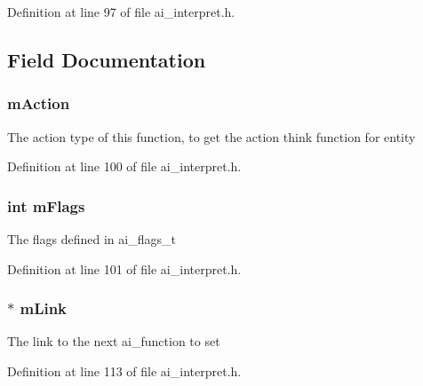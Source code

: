 Definition at line 97 of file ai\+\_\+interpret.\+h.



\subsection{Field Documentation}
\subsubsection[{\texorpdfstring{m\+Action}{mAction}}]{ m\+Action}\hypertarget{structai__function__s_a99f128ebf8f9bb2be7e2ffaee33c5554}{}\label{structai__function__s_a99f128ebf8f9bb2be7e2ffaee33c5554}
The action type of this function, to get the action think function for entity 

Definition at line 100 of file ai\+\_\+interpret.\+h.

\subsubsection[{\texorpdfstring{m\+Flags}{mFlags}}]{\setlength{\rightskip}{0pt plus 5cm}int m\+Flags}\hypertarget{structai__function__s_ab64996ddf8cd7006232fcb79bc296b03}{}\label{structai__function__s_ab64996ddf8cd7006232fcb79bc296b03}
The flags defined in ai\+\_\+flags\+\_\+t 

Definition at line 101 of file ai\+\_\+interpret.\+h.

\subsubsection[{\texorpdfstring{m\+Link}{mLink}}]{$\ast$ m\+Link}\hypertarget{structai__function__s_a7965c244eab12a7cdc29c447b8c76dbc}{}\label{structai__function__s_a7965c244eab12a7cdc29c447b8c76dbc}
The link to the next ai\+\_\+function to set 

Definition at line 113 of file ai\+\_\+interpret.\+h.

